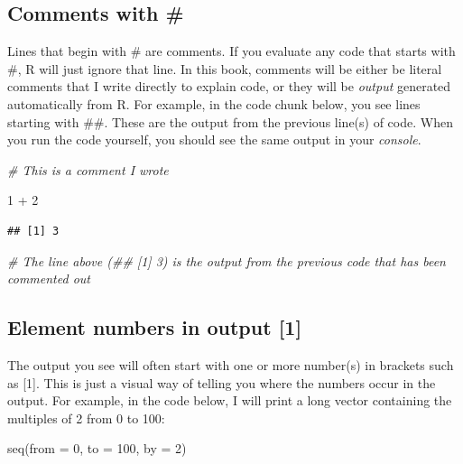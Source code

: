 \documentclass[
]{book}
\newenvironment{Shaded}{\begin{snugshade}}{\end{snugshade}}
\newcommand{\AttributeTok}[1]{\textcolor[rgb]{0.77,0.63,0.00}{#1}}
\newcommand{\CommentTok}[1]{\textcolor[rgb]{0.56,0.35,0.01}{\textit{#1}}}
\newcommand{\DecValTok}[1]{\textcolor[rgb]{0.00,0.00,0.81}{#1}}
\newcommand{\FunctionTok}[1]{\textcolor[rgb]{0.00,0.00,0.00}{#1}}
\newcommand{\NormalTok}[1]{#1}
\newcommand{\SpecialCharTok}[1]{\textcolor[rgb]{0.00,0.00,0.00}{#1}}
\begin{document}
\hypertarget{comments-with}{%
\subsection{Comments with \#}\label{comments-with}}

Lines that begin with \# are comments. If you evaluate any code that starts with \#, R will just ignore that line. In this book, comments will be either be literal comments that I write directly to explain code, or they will be \emph{output} generated automatically from R. For example, in the code chunk below, you see lines starting with \#\#. These are the output from the previous line(s) of code. When you run the code yourself, you should see the same output in your \emph{console}.

\begin{Shaded}
\begin{Highlighting}[]
\CommentTok{\# This is a comment I wrote}

\DecValTok{1} \SpecialCharTok{+} \DecValTok{2}
\end{Highlighting}
\end{Shaded}

\begin{verbatim}
## [1] 3
\end{verbatim}

\begin{Shaded}
\begin{Highlighting}[]
\CommentTok{\# The line above (\#\# [1] 3) is the output from the previous code that has been \textquotesingle{}commented out\textquotesingle{}}
\end{Highlighting}
\end{Shaded}

\hypertarget{element-numbers-in-output-1}{%
\subsection{Element numbers in output {[}1{]}}\label{element-numbers-in-output-1}}

The output you see will often start with one or more number(s) in brackets such as {[}1{]}. This is just a visual way of telling you where the numbers occur in the output. For example, in the code below, I will print a long vector containing the multiples of 2 from 0 to 100:

\begin{Shaded}
\begin{Highlighting}[]
\FunctionTok{seq}\NormalTok{(}\AttributeTok{from =} \DecValTok{0}\NormalTok{, }\AttributeTok{to =} \DecValTok{100}\NormalTok{, }\AttributeTok{by =} \DecValTok{2}\NormalTok{)}
\end{Highlighting}
\end{Shaded}
\end{document}
